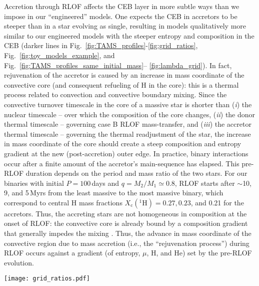 \documentclass[twocolumn,twocolappendix,trackchanges]{aastex63}
\DeclareRobustCommand{\Figref}[1]{Fig.~\ref{#1}}
\begin{document}
Accretion through RLOF affects the CEB layer in more subtle ways than
we impose in our ``engineered'' models. One expects the CEB in
accretors to be steeper than in a star evolving as single, resulting
in models qualitatively more similar to our engineered models with the
steeper entropy and composition in the CEB (darker lines in
\Figref{fig:TAMS_profiles}-\ref{fig:grid_ratios},
\Figref{fig:toy_models_example}, and \Figref{fig:TAMS_profiles_same_initial_mass}--%
\ref{fig:lambda_grid}).
In fact, rejuvenation of the accretor is caused by an increase in mass
coordinate of the convective core (and consequent refueling of H in
the core): this is a thermal process related to convection and
convective boundary mixing. Since the convective turnover timescale in
the core of a massive star is shorter than (\emph{i}) the nuclear
timescale -- over which the composition of the core changes,
(\emph{ii}) the donor thermal timescale -- governing case B RLOF
mass-transfer, and (\emph{iii}) the accretor thermal timescale --
governing the thermal readjustment of the star, the increase in mass
coordinate of the core should create a steep composition and entropy
gradient at the new (post-accretion) outer edge. In practice, binary
interactions occur after a finite amount of the accretor's
main-sequence has elapsed. This pre-RLOF duration depends on the
period and mass ratio of the two stars. For our binaries with initial
$P=100$\,days and $q=M_2/M_1\simeq 0.8$, RLOF starts after $\sim{}$10,
9, and 5\,Myrs from the least massive to the most massive binary,
which correspond to central H mass fractions
$X_\mathrm{c}(^1\mathrm{H}) = 0.27, 0.23$, and 0.21 for the accretors.
Thus, the accreting stars are not homogeneous in composition at the
onset of RLOF: the convective core is already bound by a composition
gradient that generally impedes the mixing \citep[e.g.,][]{yoon:2005}.
Thus, the advance in mass coordinate of the convective region due to
mass accretion (i.e., the ``rejuvenation process'') during RLOF occurs
against a gradient (of entropy, $\mu$, H, and He) set by the pre-RLOF
evolution.

\begin{figure*}[htbp]
  \texttt{[image: grid\_ratios.pdf]}
  \caption{Ratios of the binding energy profiles (including internal
    energy) of the accretor stars divided stars of the same total mass
    post-RLOF. The orange solid line at 1 shows the ratio of the
    accretor to itself as a check, red solid lines show the
    ratio of the accretor to a non-rotating single star, while the
    other colors show the ratio to ``engineered'' star. Each panel
    shows the ratios at the first time the models reach the radius
    indicated on the right and by the vertical dashed gray line. For
    the binding energy profiles in the numerator and denominator see
    \Figref{fig:BE_profiles}.}
  \label{fig:grid_ratios}
\end{figure*}
\end{document}
